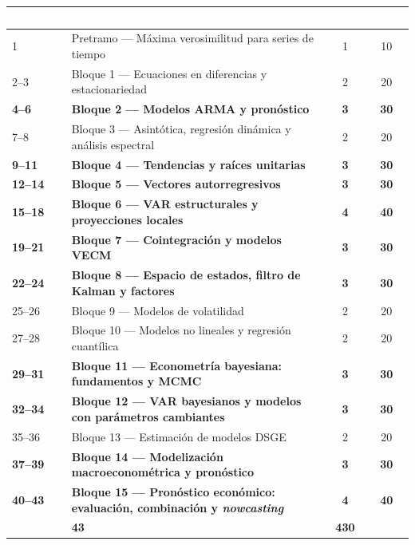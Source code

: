 \documentclass[11pt,a4paper]{article}
\newcommand{\cab}[1]{\textcolor{white}{\sffamily\bfseries #1}}
\newcommand{\filasalternas}{\rowcolors{2}{white}{tonoPalido}}
\begin{document}
\medskip
{\filasalternas
\noindent\begin{tabularx}{\textwidth}{lXcc}
\toprule
\rowcolor{tonoOscuro}\cab{Semanas} & \cab{Contenido} & \cab{Sem.} & \cab{Horas} \\
\midrule
1 & Pretramo --- Máxima verosimilitud para series de tiempo & 1 & 10 \\
2--3 & Bloque 1 --- Ecuaciones en diferencias y estacionariedad & 2 & 20 \\
\rowcolor{tonoHielo}\textbf{4--6} & \textbf{Bloque 2 --- Modelos ARMA y pronóstico} & \textbf{3} & \textbf{30} \\
7--8 & Bloque 3 --- Asintótica, regresión dinámica y análisis espectral & 2 & 20 \\
\rowcolor{tonoHielo}\textbf{9--11} & \textbf{Bloque 4 --- Tendencias y raíces unitarias} & \textbf{3} & \textbf{30} \\
\rowcolor{tonoHielo}\textbf{12--14} & \textbf{Bloque 5 --- Vectores autorregresivos} & \textbf{3} & \textbf{30} \\
\rowcolor{tonoHielo}\textbf{15--18} & \textbf{Bloque 6 --- VAR estructurales y proyecciones locales} & \textbf{4} & \textbf{40} \\
\rowcolor{tonoHielo}\textbf{19--21} & \textbf{Bloque 7 --- Cointegración y modelos VECM} & \textbf{3} & \textbf{30} \\
\rowcolor{tonoHielo}\textbf{22--24} & \textbf{Bloque 8 --- Espacio de estados, filtro de Kalman y factores} & \textbf{3} & \textbf{30} \\
25--26 & Bloque 9 --- Modelos de volatilidad & 2 & 20 \\
27--28 & Bloque 10 --- Modelos no lineales y regresión cuantílica & 2 & 20 \\
\rowcolor{tonoHielo}\textbf{29--31} & \textbf{Bloque 11 --- Econometría bayesiana: fundamentos y MCMC} & \textbf{3} & \textbf{30} \\
\rowcolor{tonoHielo}\textbf{32--34} & \textbf{Bloque 12 --- VAR bayesianos y modelos con parámetros cambiantes} & \textbf{3} & \textbf{30} \\
35--36 & Bloque 13 --- Estimación de modelos DSGE & 2 & 20 \\
\rowcolor{tonoHielo}\textbf{37--39} & \textbf{Bloque 14 --- Modelización macroeconométrica y pronóstico} & \textbf{3} & \textbf{30} \\
\rowcolor{tonoHielo}\textbf{40--43} & \textbf{Bloque 15 --- Pronóstico económico: evaluación, combinación y \emph{nowcasting}} & \textbf{4} & \textbf{40} \\
\midrule
\rowcolor{tonoHielo}\multicolumn{2}{l}{\textbf{Total}} & \textbf{43} & \textbf{430} \\
\bottomrule
\end{tabularx}
}
\end{document}
